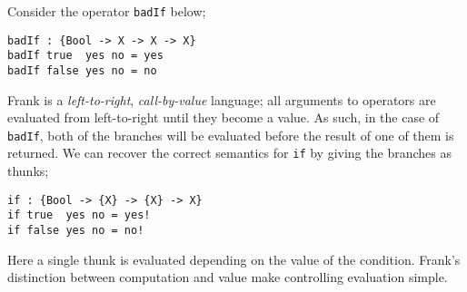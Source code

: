 \documentclass[msc,deptreport,cs]{infthesis} %
\newcommand{\code}[1]{\lstinline{#1}}
\newcommand{\todo}[1]
           {{\par\noindent\small\color{RoyalPurple}
  \framebox{\parbox{\dimexpr\linewidth-2\fboxsep-2\fboxrule}
    {\textbf{TODO:} #1}}}}
\begin{document}





Consider the operator \code{badIf} below;

\begin{lstlisting}
badIf : {Bool -> X -> X -> X}
badIf true  yes no = yes
badIf false yes no = no
\end{lstlisting}

\noindent Frank is a \emph{left-to-right}, \emph{call-by-value} language; all
arguments to operators are evaluated from left-to-right until they become a
value. As such, in the case of \code{badIf}, both of the branches will be
evaluated before the result of one of them is returned. We can recover the
correct semantics for \code{if} by giving the branches as thunks;

\begin{lstlisting}
if : {Bool -> {X} -> {X} -> X}
if true  yes no = yes!
if false yes no = no!
\end{lstlisting}

\noindent Here a single thunk is evaluated depending on the value of the
condition. Frank's distinction between computation and value make controlling
evaluation simple.


\end{document}
